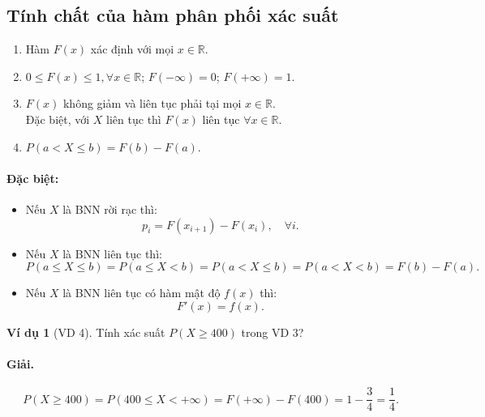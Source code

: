 \documentclass[12pt,a4paper]{article}
\theoremstyle{definition}
\newtheorem{vidu}{Ví dụ}[section]
\begin{document}
\subsection{Tính chất của hàm phân phối xác suất}

\begin{enumerate}[label=\arabic*)]
    \item Hàm $F(x)$ xác định với mọi $x \in \mathbb{R}$.
    \item $0 \le F(x) \le 1, \forall x \in \mathbb{R}$; $F(-\infty) = 0$; $F(+\infty) = 1$.
    \item $F(x)$ không giảm và liên tục phải tại mọi $x \in \mathbb{R}$.\\
    Đặc biệt, với $X$ liên tục thì $F(x)$ liên tục $\forall x \in \mathbb{R}$.
    \item $P(a < X \le b) = F(b) - F(a)$.
\end{enumerate}

\paragraph{Đặc biệt:}
\begin{itemize}
    \item Nếu $X$ là BNN rời rạc thì:
    \[
    p_i = F(x_{i+1}) - F(x_i), \quad \forall i.
    \]
    \item Nếu $X$ là BNN liên tục thì:
    \[
    P(a \le X \le b) = P(a \le X < b) = P(a < X \le b) = P(a < X < b) = F(b) - F(a).
    \]
    \item Nếu $X$ là BNN liên tục có hàm mật độ $f(x)$ thì:
    \[
    F'(x) = f(x).
    \]
\end{itemize}

\begin{vidu}[VD 4]
Tính xác suất $P(X \ge 400)$ trong VD 3?

\paragraph{Giải.}
\[
P(X \ge 400) = P(400 \le X < +\infty) = F(+\infty) - F(400) = 1 - \frac{3}{4} = \frac{1}{4}.
\]
\end{vidu}
\end{document}
